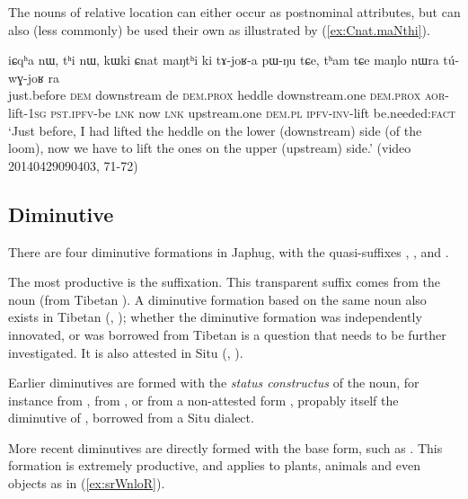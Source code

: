 The nouns of relative location can either occur as postnominal attributes, but can also (less commonly) be used their own as illustrated by (\ref{ex:Cnat.maNthi}).

\begin{exe}
\ex \label{ex:Cnat.maNthi}
\gll iɕqʰa nɯ, tʰi nɯ, kɯki ɕnat maŋtʰi ki tɤ-joʁ-a pɯ-ŋu tɕe,  tʰam tɕe maŋlo nɯra tú-wɣ-joʁ ra \\
just.before \textsc{dem} downstream de \textsc{dem}.\textsc{prox}  heddle downstream.one \textsc{dem}.\textsc{prox} \textsc{aor}-lift-\textsc{1sg} \textsc{pst}.\textsc{ipfv}-be \textsc{lnk} now \textsc{lnk} upstream.one \textsc{dem}.\textsc{pl} \textsc{ipfv}-\textsc{inv}-lift be.needed:\textsc{fact} \\
\glt `Just before, I had lifted the heddle on the lower (downstream) side (of the loom), now we have to lift the ones on the upper (upstream) side.' (video 20140429090403, 71-72)
\end{exe}
 
\subsection{Diminutive} \label{sec:diminutive}
There are four diminutive formations in Japhug, with the quasi-suffixes , ,  and .

The most productive is the  suffixation. This transparent suffix comes from the noun  (from Tibetan ). A diminutive formation based on the same noun also exists in Tibetan (\citealt{uray52diminutive},  \citealt[627]{hill14derivational}); whether the diminutive formation was independently innovated, or was borrowed from Tibetan is a question that needs to be further investigated. It is also attested in Situ (\citealt{zhang16bragdbar}, \citealt[151]{lai17khroskyabs}).

Earlier diminutives are formed with the\textit{ status constructus} of the noun, for instance  from ,  from , or  from a non-attested form , propably itself the  diminutive of , borrowed from a Situ dialect.

More recent diminutives are directly formed with the base form, such as . This formation is extremely productive, and applies to plants, animals and even objects as in (\ref{ex:srWnloR}).

